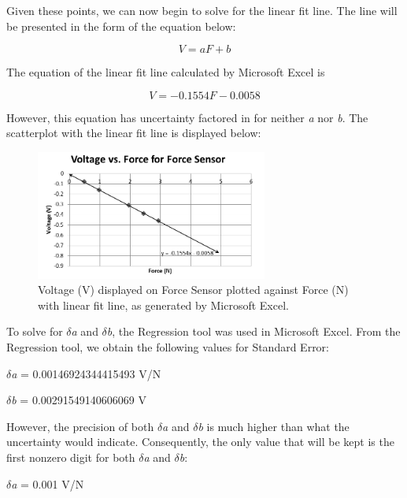 \documentclass[titlepage]{article}
\begin{document}
Given these points, we can now begin to solve for the linear fit line. The line will be presented in the form of the equation below:

\begin{equation}
    \label{eq:line_regres}
    V = aF+b
\end{equation}

The equation of the linear fit line calculated by Microsoft Excel is

\begin{equation}
    \label{eq:line_fit}
     V = -0.1554F - 0.0058
\end{equation}

However, this equation has uncertainty factored in for neither \textit{a} nor \textit{b}. The scatterplot with the linear fit line is displayed below:

\begin{figure}[!htbp]
    \centering
    \includegraphics[width=3.0in]{LinReg.png}
    \caption{Voltage (V) displayed on Force Sensor plotted against Force (N) with linear fit line, as generated by Microsoft Excel.}
    \label{fig:2}
\end{figure}

To solve for $\delta$\textit{a} and $\delta$\textit{b}, the Regression tool was used  in Microsoft Excel. From the Regression tool, we obtain the following values for Standard Error:

\begin{center}
$\delta$\textit{a} = 0.00146924344415493 V/N
\end{center}

\begin{center}
$\delta$\textit{b} = 0.00291549140606069 V
\end{center}

However, the precision of both $\delta$\textit{a} and $\delta$\textit{b} is much higher than what the uncertainty would indicate. Consequently, the only value that will be kept is the first nonzero digit for both $\delta$\textit{a} and $\delta$\textit{b}:

\begin{center}
$\delta$\textit{a} = 0.001 V/N
\end{center}
\end{document}
